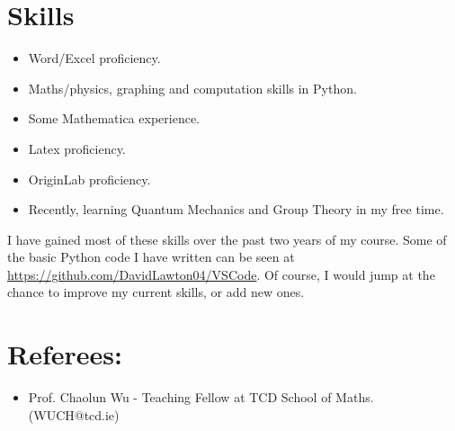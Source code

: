 \documentclass{article}
\begin{document}
\section{Skills}
\begin{itemize}
\item Word/Excel proficiency.
\item Maths/physics, graphing and computation skills in Python.
\item Some Mathematica experience.
\item Latex proficiency.
\item OriginLab proficiency.
\item Recently, learning Quantum Mechanics and Group Theory in my free time.
\end{itemize}
I have gained most of these skills over the past two years of my course. Some of the basic Python code I have written can be seen at \url{https://github.com/DavidLawton04/VSCode}. Of course, I would jump at the chance to improve my current skills, or add new ones.
\section{Referees:}
\begin{itemize}
\item Prof. Chaolun Wu - Teaching Fellow at TCD School of Maths. (WUCH@tcd.ie)
\end{itemize}
\end{document}
